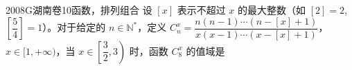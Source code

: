 
\begin{problem}{2008}{G}{湖南卷}{10}{函数，排列组合}
设 $[x]$ 表示不超过 $x$ 的最大整数（如 $[2]=2$, $\left[\dfrac{5}{4}\right]=1$）。对于给定的 $n\in\mathbb{N}^*$，定义 $C_n^x=\dfrac{n(n-1)\cdots(n-[x]+1)}{x(x-1)\cdots(x-[x]+1)}$，$x\in[1,+\infty)$，当 $x\in\left[\dfrac{3}{2},3\right)$ 时，函数 $C_8^x$ 的值域是
\begin{choices}
\choice{{$\left[\dfrac{16}{3},28\right)$}}
\choice{{$\left[\dfrac{16}{3},56\right)$}}
\choice{{$\left(4,\dfrac{28}{3}\right]\cup[28,56)$}}
\choice{{$\left(4,\dfrac{16}{3}\right]\cup\left(\dfrac{28}{3},28\right]$}}
\end{choices}
\end{problem}

\begin{answer}

\end{answer}

\begin{solutions}

\end{solutions}